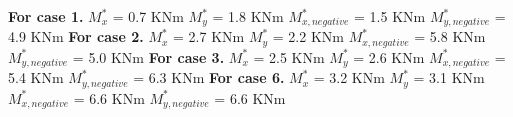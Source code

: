 \documentclass{article}%
\begin{document}
%
\textbf{For case 1.\newline%
\newline%
}%
$M_{x}^{*}$ = 0.7 KNm%
\newline%
\newline%
%
$M_{y}^{*}$ = 1.8 KNm%
\newline%
\newline%
%
$M_{x,negative}^{*}$ = 1.5 KNm%
\newline%
\newline%
%
$M_{y,negative}^{*}$ = 4.9 KNm%
\newline%
\newline%
%
\textbf{For case 2.\newline%
\newline%
}%
$M_{x}^{*}$ = 2.7 KNm%
\newline%
\newline%
%
$M_{y}^{*}$ = 2.2 KNm%
\newline%
\newline%
%
$M_{x,negative}^{*}$ = 5.8 KNm%
\newline%
\newline%
%
$M_{y,negative}^{*}$ = 5.0 KNm%
\newline%
\newline%
%
\textbf{For case 3.\newline%
\newline%
}%
$M_{x}^{*}$ = 2.5 KNm%
\newline%
\newline%
%
$M_{y}^{*}$ = 2.6 KNm%
\newline%
\newline%
%
$M_{x,negative}^{*}$ = 5.4 KNm%
\newline%
\newline%
%
$M_{y,negative}^{*}$ = 6.3 KNm%
\newline%
\newline%
%
\textbf{For case 6.\newline%
\newline%
}%
$M_{x}^{*}$ = 3.2 KNm%
\newline%
\newline%
%
$M_{y}^{*}$ = 3.1 KNm%
\newline%
\newline%
%
$M_{x,negative}^{*}$ = 6.6 KNm%
\newline%
\newline%
%
$M_{y,negative}^{*}$ = 6.6 KNm%
\newline%
\newline%

%
\end{document}
